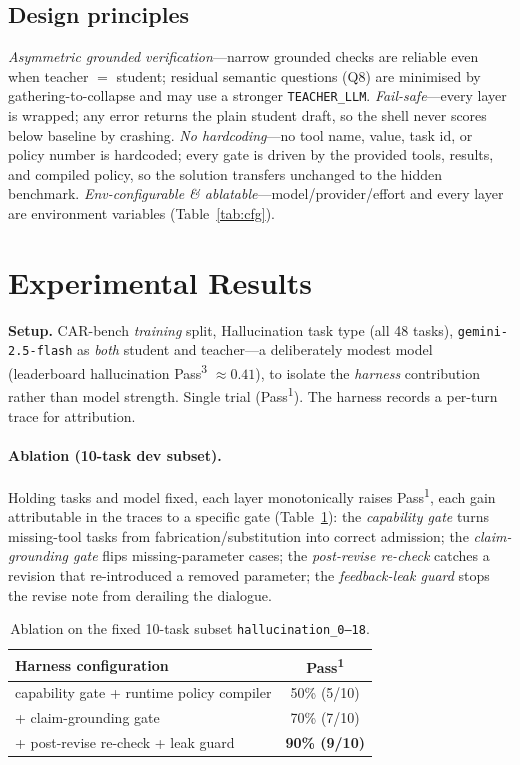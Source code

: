 \documentclass{article}
\begin{document}
\subsection{Design principles}
\emph{Asymmetric grounded verification}---narrow grounded checks are reliable even
when teacher $=$ student; residual semantic questions (Q8) are minimised by
gathering-to-collapse and may use a stronger \texttt{TEACHER\_LLM}.
\emph{Fail-safe}---every layer is wrapped; any error returns the plain student draft,
so the shell never scores below baseline by crashing. \emph{No hardcoding}---no tool
name, value, task id, or policy number is hardcoded; every gate is driven by the
provided tools, results, and compiled policy, so the solution transfers unchanged to
the hidden benchmark. \emph{Env-configurable \& ablatable}---model/provider/effort and
every layer are environment variables (Table~\ref{tab:cfg}).

\section{Experimental Results}
\textbf{Setup.} CAR-bench \emph{training} split, Hallucination task type (all 48
tasks), \texttt{gemini-2.5-flash} as \emph{both} student and teacher---a deliberately
modest model (leaderboard hallucination Pass\textsuperscript{3} $\approx 0.41$), to
isolate the \emph{harness} contribution rather than model strength. Single trial
(Pass\textsuperscript{1}). The harness records a per-turn trace for attribution.

\paragraph{Ablation (10-task dev subset).} Holding tasks and model fixed, each layer
monotonically raises Pass\textsuperscript{1}, each gain attributable in the traces to a
specific gate (Table~\ref{tab:ablation}): the \emph{capability gate} turns missing-tool
tasks from fabrication/substitution into correct admission; the \emph{claim-grounding
gate} flips missing-parameter cases; the \emph{post-revise re-check} catches a revision
that re-introduced a removed parameter; the \emph{feedback-leak guard} stops the revise
note from derailing the dialogue.

\begin{table}[t]
\centering\small
\begin{tabular}{@{}lc@{}}
\toprule
Harness configuration & Pass\textsuperscript{1}\\
\midrule
capability gate + runtime policy compiler & 50\% (5/10)\\
\quad + claim-grounding gate & 70\% (7/10)\\
\quad + post-revise re-check + leak guard & \textbf{90\% (9/10)}\\
\bottomrule
\end{tabular}
\caption{Ablation on the fixed 10-task subset \texttt{hallucination\_0--18}.}
\label{tab:ablation}
\end{table}
\end{document}
